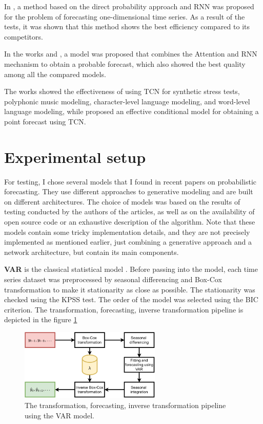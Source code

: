 \documentclass[12pt,a4paper]{article}
\begin{document}
In \cite{deepar}, a method based on the direct probability approach and RNN was proposed for the problem of forecasting one-dimensional time series. As a result of the tests, it was shown that this method shows the best efficiency compared to its competitors.

In the works \cite{multihorizon} and \cite{interpr}, a model was proposed that combines the Attention and RNN mechanism to obtain a probable forecast, which also showed the best quality among all the compared models.

The works \cite{BaiTCN2018} showed the effectiveness of using TCN for synthetic stress tests, polyphonic music modeling, character-level language modeling, and word-level language modeling, while \cite{borovykh2018conditional} proposed an effective conditional model for obtaining a point forecast using TCN.

\section{Experimental setup}

For testing, I chose several models that I found in recent papers on probabilistic forecasting. They use different approaches to generative modeling and are built on different architectures. The choice of models was based on the results of testing conducted by the authors of the articles, as well as on the availability of open source code or an exhaustive description of the algorithm. Note that these models contain some tricky implementation details, and they are not precisely implemented as mentioned earlier, just combining a generative approach and a network architecture, but contain its main components.

\textbf{VAR} is the classical statistical model \cite{fpp3}. Before passing into the model, each time series dataset was preprocessed by seasonal differencing and Box-Cox transformation to make it stationarity as close as possible. The stationarity was checked using the KPSS test. The order of the model was selected using the BIC criterion. The transformation, forecasting, inverse transformation pipeline is depicted in the figure \ref{fig:transformation_var}

\begin{figure}[h]
    \centering
    \includegraphics[width=0.6\textwidth]{transformation_var.pdf}
    \caption{The transformation, forecasting, inverse transformation pipeline using the VAR model.}
    \label{fig:transformation_var}
\end{figure}
\end{document}
